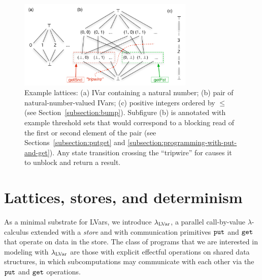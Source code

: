 
\begin{figure}[tb]
\centering
\includegraphics[width=3.3in]{chapter2/figures/ExampleLattices2.pdf} 
  \caption{\footnotesize Example lattices: (a) IVar
    containing a natural number; (b) pair of natural-number-valued IVars; (c)
    positive integers ordered by $\leq$ (see Section~\ref{subsection:bump}).
    Subfigure (b) is annotated with example threshold
    sets that would correspond to a blocking read of the first or
    second element of the pair (see Sections~\ref{subsection:putget} and \ref{subsection:programming-with-put-and-get}).
    Any state transition crossing the
    ``tripwire'' for  causes it to unblock
    and return a result.}

  \label{f:lattice-examples}
\end{figure}

\section{Lattices, stores, and determinism}\label{section:domains}


As a minimal substrate for LVars, we introduce $\lambda_{\textrm{LVar}}$, 
 a parallel call-by-value
$\lambda$-calculus extended with a {\em store} and with communication
primitives $\mbox{\texttt{put}}$ and $\mbox{\texttt{get}}$ that operate on data in the store.
The class of programs that we are interested in modeling with
$\lambda_{\textrm{LVar}}$ are those with explicit effectful operations on shared
data
structures, in which subcomputations may communicate with each other
via the $\mbox{\texttt{put}}$ and
$\mbox{\texttt{get}}$ operations.

